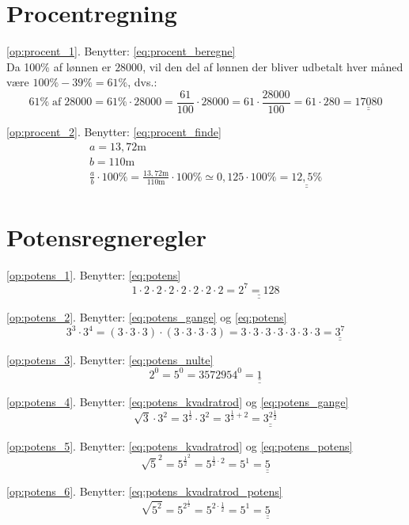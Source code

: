\documentclass[11pt,a5paper,fleqn,leqno]{book}
\begin{document}
\section{Procentregning}

\ref{op:procent_1}. Benytter: \eqref{eq:procent_beregne} \\
Da 100\% af lønnen er $28000$, vil den del af lønnen der bliver udbetalt hver måned være $100\% - 39\% = 61\%$, dvs.:
\[61\% \; \text{af} \; 28000 = 61\% \cdot 28000 = \frac{61}{100} \cdot 28000 = 61 \cdot \frac{28000}{100} = 61 \cdot 280 = \underline{\underline{17080}}\]

\ref{op:procent_2}. Benytter: \eqref{eq:procent_finde} \\
\begin{displaymath}\begin{array}{l}
a = 13,72 \text{m} \\
b = 110 \text{m} \\
\frac{a}{b} \cdot 100\% = \frac{13,72 \text{m}}{110 \text{m}} \cdot 100\% \simeq 0,125 \cdot 100\% = \underline{\underline{12,5\%}}
\end{array}\end{displaymath}

\section{Potensregneregler}

\ref{op:potens_1}. Benytter: \eqref{eq:potens}
\[1 \cdot 2 \cdot 2 \cdot 2 \cdot 2 \cdot 2 \cdot 2 \cdot 2 = \underline{\underline{2^7 = 128}}\]

\ref{op:potens_2}. Benytter: \eqref{eq:potens_gange} og \eqref{eq:potens}
\[3^3 \cdot 3^4 = (3 \cdot 3 \cdot 3) \cdot (3 \cdot 3 \cdot 3 \cdot 3) = 3 \cdot 3 \cdot 3 \cdot 3 \cdot 3 \cdot 3 \cdot 3 = \underline{\underline{3^7}}\]

\ref{op:potens_3}. Benytter: \eqref{eq:potens_nulte}
\[2^0 = 5^0 = 3572954^0 = \underline{\underline{1}}\]

\ref{op:potens_4}. Benytter: \eqref{eq:potens_kvadratrod} og \eqref{eq:potens_gange}
\[\sqrt{3} \cdot 3^2 = 3^{\frac{1}{2}} \cdot 3^2 = 3^{\frac{1}{2}+2} = \underline{\underline{3^{2\frac{1}{2}}}}\]

\ref{op:potens_5}. Benytter: \eqref{eq:potens_kvadratrod} og \eqref{eq:potens_potens}
\[\sqrt{5}^2 = 5^{\frac{1}{2}^2} = 5^{\frac{1}{2} \cdot 2} = 5^1 = \underline{\underline{5}}\]

\ref{op:potens_6}. Benytter: \eqref{eq:potens_kvadratrod_potens}
\[\sqrt{5^2} = 5^{2^{\frac{1}{2}}} = 5^{2 \cdot \frac{1}{2}} = 5^1 = \underline{\underline{5}}\]
\end{document}
